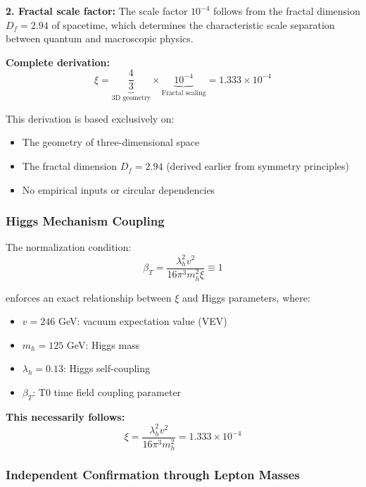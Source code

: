 \documentclass[12pt,a4paper]{article}
\numberwithin{equation}{section}
\newcommand{\xipar}{\xi}
\begin{document}
\textbf{2. Fractal scale factor:}
The scale factor $10^{-4}$ follows from the fractal dimension $D_f = 2.94$ of spacetime, which determines the characteristic scale separation between quantum and macroscopic physics.

\textbf{Complete derivation:}
\begin{equation}
	\xipar = \underbrace{\frac{4}{3}}_{\text{3D geometry}} \times \underbrace{10^{-4}}_{\text{Fractal scaling}} = 1.333 \times 10^{-4}
	\label{eq:xi_geometric}
\end{equation}

This derivation is based exclusively on:
\begin{itemize}
	\item The geometry of three-dimensional space
	\item The fractal dimension $D_f = 2.94$ (derived earlier from symmetry principles)
	\item No empirical inputs or circular dependencies
\end{itemize}
	\subsubsection{Higgs Mechanism Coupling}
	
	The normalization condition:
	\begin{equation}
		\beta_T = \frac{\lambda_h^2 v^2}{16\pi^3 m_h^2 \xipar} \equiv 1
		\label{eq:beta_normierung}
	\end{equation}
	
	enforces an exact relationship between $\xipar$ and Higgs parameters, where:
	\begin{itemize}
		\item $v = 246$ GeV: vacuum expectation value (VEV)
		\item $m_h = 125$ GeV: Higgs mass
		\item $\lambda_h = 0.13$: Higgs self-coupling
		\item $\beta_T$: T0 time field coupling parameter
	\end{itemize}
	
	\textbf{This necessarily follows:}
	\begin{equation}
		\xipar = \frac{\lambda_h^2 v^2}{16\pi^3 m_h^2} = 1.333 \times 10^{-4}
		\label{eq:xi_higgs}
	\end{equation}
	
	\subsubsection{Independent Confirmation through Lepton Masses}
	
\end{document}

